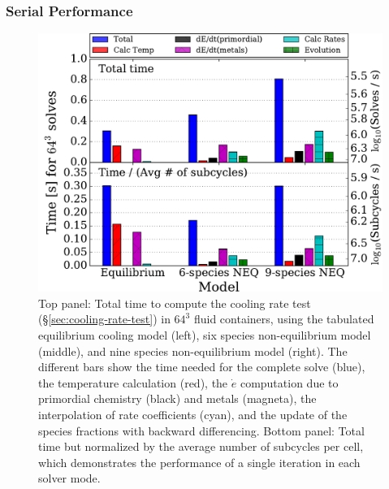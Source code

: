 \subsubsection{Serial Performance}

\begin{figure}
  \centering
  \includegraphics[width=\columnwidth]{performance.pdf}
  \caption{Top panel: Total time to compute the cooling rate test
    (\S\ref{sec:cooling-rate-test}) in $64^3$ fluid containers, using
    the tabulated equilibrium cooling model (left), six species
    non-equilibrium model (middle), and nine species non-equilibrium
    model (right).  The different bars show the time needed for the
    complete solve (blue), the temperature calculation (red), the
    $\dot{e}$ computation due to primordial chemistry (black) and
    metals (magneta), the interpolation of rate coefficients (cyan),
    and the update of the species fractions with backward
    differencing.  Bottom panel: Total time but normalized by the
    average number of subcycles per cell, which demonstrates the
    performance of a single iteration in each solver
    mode.} \label{fig:performance}
\end{figure}

